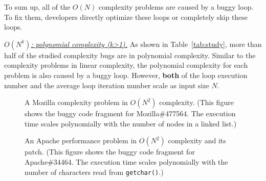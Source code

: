 To sum up, all of the $O(N)$ complexity problems are caused by a buggy loop. 
To fix them, developers directly optimize these loops or completely skip these loops. 


{\underline{\textit{$O(N^k)$: polynomial complexity (k>1).}}}
As shown in Table~\ref{tab:study}, 
more than half of the studied complexity bugs are in polynomial complexity. 
Similar to the complexity problems in linear complexity,
the polynomial complexity for each problem is also caused by a buggy loop.
However, {\bf both} of the loop execution number 
and the average loop iteration number
scale as input size $N$.


\begin{figure}
\centering
{}
  \mbox{}
  \vspace{-0.1in}
\caption{A Mozilla complexity problem in $O(N^2)$ complexity.
\footnotesize{(This figure shows the buggy code fragment for Mozilla\#477564. 
The execution time scales polynomially with the number of nodes in a linked list.)}}
\vspace{-0.05in}
\label{fig:Mozilla477564}
\vspace{-0.15in}
\end{figure}

\begin{figure}
\centering
{}
  \mbox{}
  \vspace{-0.1in}
\caption{An Apache performance problem in $O(N^2)$ complexity and its patch. 
\footnotesize{(This figure shows the buggy code fragment for Apache\#34464. 
 The execution time scales polynomially with the number of characters read from \texttt{getchar()}.)}}
\label{fig:apache34464}
\vspace{-0.3in}
\end{figure}

